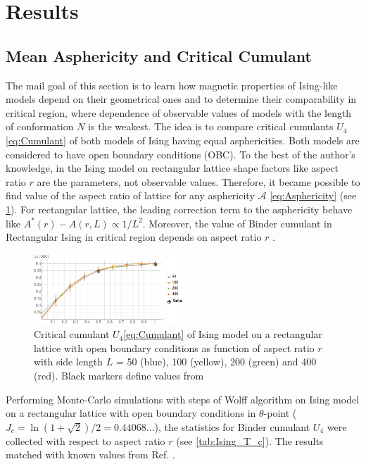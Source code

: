 \section{Results}

\subsection{Mean Asphericity and Critical Cumulant}

The mail goal of this section is to learn how magnetic properties of Ising-like models depend on their geometrical ones and to determine their comparability in critical region, where dependence of observable values of models with the length of conformation $N$ is the weakest. The idea is to compare critical cumulants $U_{4}$ \eqref{eq:Cumulant} of both models of Ising having equal asphericities. Both models are considered to have open boundary conditions (OBC). To the best of the author’s knowledge, in the Ising model on rectangular lattice shape factors like aspect ratio $r$ are the parameters, not observable values. Therefore, it became possible to find value of the aspect ratio of lattice for any asphericity $\mathcal{A}$ \eqref{eq:Asphericity} (see \cref{fig:A_r}). For rectangular lattice, the leading correction term to the asphericity behave like $A^{*}(r) - A(r, L) \propto 1 / L^{2}$. Moreover, the value of Binder cumulant in Rectangular Ising in critical region depends on aspect ratio $r$ \cite{Selke2006}.

\begin{figure}[h]
    \centering
    \includegraphics[width=0.5\textwidth]{Images/CumulantOBC.png}
    \caption{Critical cumulant $U_{4}$\eqref{eq:Cumulant} of Ising model on a rectangular lattice with open boundary conditions as function of aspect ratio $r$ with side length $L$ = 50 (blue), 100 (yellow), 200 (green) and 400 (red). Black markers define values from \cite{Selke2006}}
    \label{fig:A_r}
\end{figure} 

Performing Monte-Carlo simulations with steps of Wolff algorithm \cite{Newmanb1999} on Ising model on a rectangular lattice with open boundary conditions in $\theta$-point ($J_{c} = \ln{(1 + \sqrt{2}) / 2} =  0.44068... $), the statistics for Binder cumulant $U_{4}$ were collected with respect to aspect ratio $r$ (see \cref{tab:Ising_T_c}). The results matched with known values from Ref. \cite{Selke2006}.

